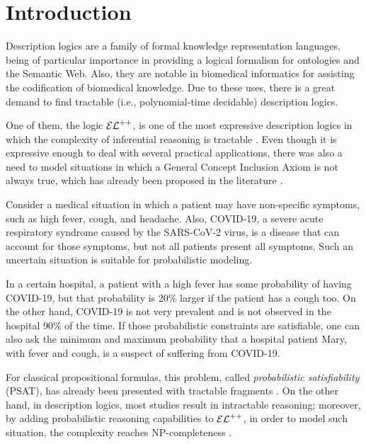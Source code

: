 
\chapter{Introduction}
\label{cap:introduction}

Description logics are a family of formal knowledge representation languages, being of particular importance in providing a logical formalism for ontologies and the Semantic Web. Also, they are notable in biomedical informatics for assisting the codification of biomedical knowledge. Due to these uses, there is a great demand to find tractable (i.e., polynomial-time decidable) description logics.

One of them, the logic $\mathcal{EL}^{++}$, is one of the most expressive description logics in which the complexity of inferential reasoning is tractable \citep{Baader2005a}. Even though it is expressive enough to deal with several practical applications, there was also a need to model situations in which a General Concept Inclusion Axiom is not always true, which has already been proposed in the literature \citep{boole1854investigation}.

\begin{example}
  \label{exmp:real-example}
Consider a medical situation in which a patient may have non-specific symptoms, such as high fever, cough, and headache. Also, COVID-19, a severe acute respiratory syndrome caused by the  SARS-CoV-2 virus, is a disease that can account for those symptoms, but not all patients present all symptoms. Such an uncertain situation is suitable for probabilistic modeling.

In a certain hospital, a patient with a high fever has some probability of having COVID-19, but that probability is 20\% larger if the patient has a cough too. On the other hand, COVID-19 is not very prevalent and is not observed in the hospital 90\% of the time. If those probabilistic constraints are satisfiable, one can also ask the minimum and maximum probability that a hospital patient Mary, with fever and cough, is a suspect of suffering from COVID-19.
\end{example}

For classical propositional formulas, this problem, called \emph{probabilistic satisfiability} (PSAT), has already been presented with tractable fragments \citep{andersen2001easy}. On the other hand, in description logics, most studies result in intractable reasoning; moreover, by adding probabilistic reasoning capabilities to $\mathcal{EL}^{++}$, in order to model such situation, the complexity reaches NP-completeness \citep{Fin2019b}. 
    
